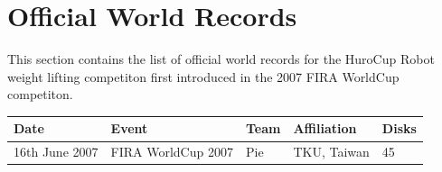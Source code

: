 \documentclass[12pt]{hurocup}
\begin{document}
\section{Official World Records}
\label{sec:worldrecords}

This section contains the list of official world records for the
HuroCup Robot weight lifting competiton first introduced in the 2007
FIRA WorldCup competiton.

\begin{center}
\begin{tabular}{|lllll|}
\hline
Date & Event & Team & Affiliation & Disks \\
\hline
16th June 2007 & FIRA WorldCup 2007 & Pie      & TKU, Taiwan    & 45  \\
\hline
\end{tabular}
\end{center}
\end{document}
